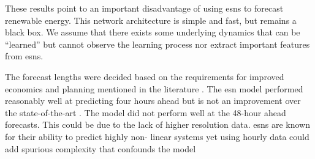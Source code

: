 These results point to an important disadvantage of using \glspl{esn} to
forecast renewable energy. This network architecture is simple and fast, but
remains a black box. We assume that there exists some underlying dynamics that
can be ``learned'' but cannot observe the learning process nor extract important
features from \glspl{esn}.


The forecast lengths were decided based on the requirements for improved
economics and planning mentioned in the literature
 \cite{wang_quantifying_2016,mc_garrigle_quantifying_2015,brancucci_martinez-anido_value_2016}. The \gls{esn} model performed reasonably well at predicting
 four hours ahead but is not an improvement over the state-of-the-art
 \cite{wang_quantifying_2016,powers_weather_2017}. The model did not perform
 well at the 48-hour ahead forecasts. This could be due to the lack of higher
 resolution data. \glspl{esn} are known for their ability to predict highly non-
 linear systems \cite{jaeger_harnessing_2004,lukosevicius_reservoir_2009} yet
 using hourly data could add spurious complexity that confounds the model
 \cite{garland_model-free_2014}

